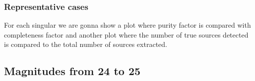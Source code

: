 \documentclass{article}
\begin{document}
\subsubsection{Representative cases}
For each singular we are gonna show a plot where purity factor is compared with completeness factor and another plot where the number of true sources detected is compared to the total number of sources extracted.

%
%
\subsection{Magnitudes from 24 to 25}

\end{document}
